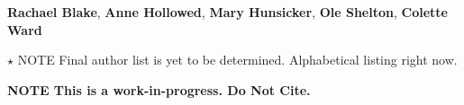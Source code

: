 \textbf{Rachael Blake}, 
\textbf{Anne Hollowed}, 
\textbf{Mary Hunsicker}, 
\textbf{Ole Shelton}, 
\textbf{Colette Ward}

$\star$ NOTE Final author list is yet to be determined. Alphabetical listing right now. 

\textbf {NOTE This is a work-in-progress.  Do Not Cite.}  
